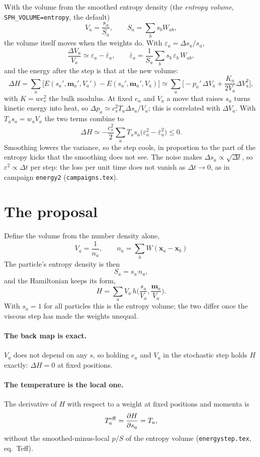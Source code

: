 \documentclass[11pt,aps,preprint,nofootinbib,superscriptaddress,tightenlines]{revtex4-2}
\def\st{\begin{equation}}
\def\stp{\end{equation}}
\let\oldparagraph\paragraph
\renewcommand{\paragraph}{\par\bigskip\oldparagraph}
\begin{document}
With the volume from the smoothed entropy density (the \emph{entropy volume}, \texttt{SPH\_VOLUME=entropy}, the default)
\st
V_a=\frac{s_a}{S_a},\qquad S_a=\sum_bs_bW_{ab},
\stp
the volume itself moves when the weights do.  With $\varepsilon_a=\Delta s_a/s_a$,
\st
\frac{\Delta V_a}{V_a}\simeq\varepsilon_a-\bar\varepsilon_a,\qquad
\bar\varepsilon_a=\frac1{S_a}\sum_bs_b\,\varepsilon_b\,W_{ab},
\stp
and the energy after the step is that at the new volume:
\st
\Delta H=\sum_a\Big[E(s_a',\bm m_a',V_a')-E(s_a',\bm m_a',V_a)\Big]
\simeq\sum_a\Big[-p_a'\,\Delta V_a+\frac{K_a}{2V_a}\Delta V_a^2\Big],
\stp
with $K=wc_s^2$ the bulk modulus.  At fixed $e_a$ and $V_a$ a move that raises $s_a$
turns kinetic energy into heat, so $\Delta p_a\simeq c_s^2T_a\Delta s_a/V_a$; this is
correlated with $\Delta V_a$.  With $T_as_a=w_aV_a$ the two terms combine to
\st
\Delta H\simeq-\frac{c_s^2}{2}\sum_aT_as_a\big(\varepsilon_a^2-\bar\varepsilon_a^2\big)\le0 .
\label{estimate}
\stp
Smoothing lowers the variance, so the step cools, in proportion to the part of the
entropy kicks that the smoothing does not see.  The noise makes $\Delta s_a\propto\sqrt{\Delta t}$,
so $\varepsilon^2\propto\Delta t$ per step: the loss per unit time does not vanish as
$\Delta t\to0$, as in campaign \texttt{energy2} (\texttt{campaigns.tex}).

\section{The proposal}
\label{sec:proposal}

Define the volume from the number density alone,
\st
\boxed{\;V_a=\frac1{n_a},\qquad n_a=\sum_bW(\bm x_a-\bm x_b)\;}
\label{Vn}
\stp
The particle's entropy density is then
\st
S_a=s_a\,n_a ,
\stp
and the Hamiltonian keeps its form,
\st
H=\sum_aV_a\,h\Big(\frac{s_a}{V_a},\frac{\bm m_a}{V_a}\Big).
\stp
With $s_a=1$ for all particles this is the entropy volume; the two differ once the
viscous step has made the weights unequal.

\paragraph{The back map is exact.}  $V_a$ does not depend on any $s$, so holding $e_a$
and $V_a$ in the stochastic step holds $H$ exactly: $\Delta H=0$ at fixed positions.

\paragraph{The temperature is the local one.}  The derivative of $H$ with respect to a
weight at fixed positions and momenta is
\st
T^{\rm eff}_a=\frac{\partial H}{\partial s_a}=T_a ,
\stp
without the smoothed-minus-local $p/S$ of the entropy volume (\texttt{energystep.tex}, eq.\
Teff).
\end{document}
